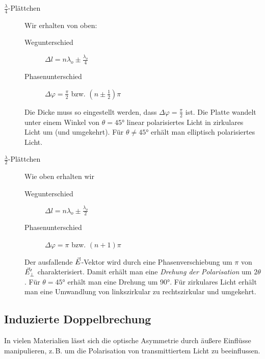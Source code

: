 \begin{description}
\item[$\frac{\lambda}{4}$-Plättchen] Wir erhalten von oben:
  \begin{description}
  \item[Wegunterschied] $\Delta l = n\lambda_o \pm \frac{\lambda_o}{4}$
  \item[Phasenunterschied] $\Delta\varphi = \frac{\pi}{2}$
    bzw. $(n\pm \frac{1}{2})\pi$
  \end{description}
  Die Dicke muss so eingestellt werden, dass
  $\Delta\varphi=\frac{\pi}{2}$ ist. Die Platte wandelt unter einem
  Winkel von $\theta=\ang{45}$ linear polarisiertes Licht in
  zirkulares Licht um (und umgekehrt).
  Für $\theta\neq\ang{45}$ erhält man elliptisch polarisiertes Licht.
\item[$\frac{\lambda}{2}$-Plättchen] Wie oben erhalten wir
  \begin{description}
  \item[Wegunterschied] $\Delta l = n\lambda_o \pm \frac{\lambda_o}{2}$
  \item[Phasenunterschied] $\Delta\varphi = \pi$
    bzw. $(n+1)\pi$
  \end{description}
  Der ausfallende $\vec{E}$-Vektor wird durch eine Phasenverschiebung
  um $\pi$ von $\vec{E}_\bot^\prime$ charakterisiert.
  Damit erhält man eine \emph{Drehung der Polarisation} um $2\theta$.
  Für $\theta=\ang{45}$ erhält man eine Drehung um \ang{90}.
  Für zirkulares Licht erhält man eine Umwandlung von linkszirkular zu
  rechtszirkular und umgekehrt.
\end{description}


\subsection{Induzierte Doppelbrechung}
In vielen Materialien lässt sich die optische Asymmetrie durch äußere
Einflüsse manipulieren, z.\,B. um die Polarisation von transmittiertem
Licht zu beeinflussen.

